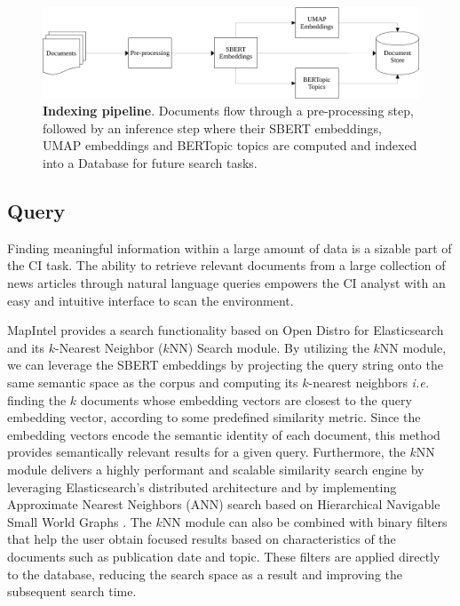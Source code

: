 \documentclass[a4paper]{article}
\begin{document}
\begin{figure}[H]
	\centering
	\includegraphics[scale=0.7]{./assets/indexing_pipeline}
	\caption{\textbf{Indexing pipeline}. Documents flow through a pre-processing step, followed by an inference step where their SBERT embeddings, UMAP embeddings and BERTopic topics are computed and indexed into a Database for future search tasks.}
	\label{indexing_pipeline}
\end{figure}

\subsection{Query} \label{query}
Finding meaningful information within a large amount of data is a sizable part of the CI task. The ability to retrieve relevant documents from a large collection of news articles through natural language queries empowers the CI analyst with an easy and intuitive interface to scan the environment.

MapIntel provides a search functionality based on Open Distro for Elasticsearch and its $k$-Nearest Neighbor ($k$NN) Search module. By utilizing the $k$NN module, we can leverage the SBERT embeddings by projecting the query string onto the same semantic space as the corpus and computing its $k$-nearest neighbors \textit{i.e.} finding the $k$ documents whose embedding vectors are closest to the query embedding vector, according to some predefined similarity metric. Since the embedding vectors encode the semantic identity of each document, this method provides semantically relevant results for a given query. Furthermore, the $k$NN module delivers a highly performant and scalable similarity search engine by leveraging Elasticsearch’s distributed architecture and by implementing Approximate Nearest Neighbors (ANN) search based on Hierarchical Navigable Small World Graphs \citep{malkov2018}. The $k$NN module can also be combined with binary filters that help the user obtain focused results based on characteristics of the documents such as publication date and topic. These filters are applied directly to the database, reducing the search space as a result and improving the subsequent search time.
\end{document}
